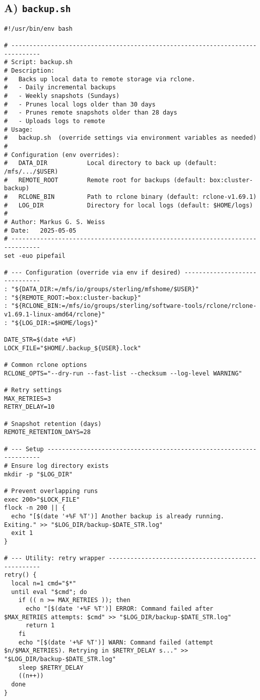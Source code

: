 \documentclass[12pt,letterpaper]{article}
\begin{document}
\subsection{A) \texttt{backup.sh}}
\begin{lstlisting}[style=custombash]
#!/usr/bin/env bash

# ------------------------------------------------------------------------------
# Script: backup.sh
# Description:
#   Backs up local data to remote storage via rclone.
#   - Daily incremental backups
#   - Weekly snapshots (Sundays)
#   - Prunes local logs older than 30 days
#   - Prunes remote snapshots older than 28 days
#   - Uploads logs to remote
# Usage:
#   backup.sh  (override settings via environment variables as needed)
#
# Configuration (env overrides):
#   DATA_DIR           Local directory to back up (default: /mfs/.../$USER)
#   REMOTE_ROOT        Remote root for backups (default: box:cluster-backup)
#   RCLONE_BIN         Path to rclone binary (default: rclone-v1.69.1)
#   LOG_DIR            Directory for local logs (default: $HOME/logs)
#
# Author: Markus G. S. Weiss
# Date:   2025-05-05
# ------------------------------------------------------------------------------
set -euo pipefail

# --- Configuration (override via env if desired) ------------------------------
: "${DATA_DIR:=/mfs/io/groups/sterling/mfshome/$USER}"
: "${REMOTE_ROOT:=box:cluster-backup}"
: "${RCLONE_BIN:=/mfs/io/groups/sterling/software-tools/rclone/rclone-v1.69.1-linux-amd64/rclone}"
: "${LOG_DIR:=$HOME/logs}"

DATE_STR=$(date +%F)
LOCK_FILE="$HOME/.backup_${USER}.lock"

# Common rclone options
RCLONE_OPTS="--dry-run --fast-list --checksum --log-level WARNING"

# Retry settings
MAX_RETRIES=3
RETRY_DELAY=10

# Snapshot retention (days)
REMOTE_RETENTION_DAYS=28

# --- Setup --------------------------------------------------------------------
# Ensure log directory exists
mkdir -p "$LOG_DIR"

# Prevent overlapping runs
exec 200>"$LOCK_FILE"
flock -n 200 || {
  echo "[$(date '+%F %T')] Another backup is already running. Exiting." >> "$LOG_DIR/backup-$DATE_STR.log"
  exit 1
}

# --- Utility: retry wrapper ---------------------------------------------------
retry() {
  local n=1 cmd="$*"
  until eval "$cmd"; do
    if (( n >= MAX_RETRIES )); then
      echo "[$(date '+%F %T')] ERROR: Command failed after $MAX_RETRIES attempts: $cmd" >> "$LOG_DIR/backup-$DATE_STR.log"
      return 1
    fi
    echo "[$(date '+%F %T')] WARN: Command failed (attempt $n/$MAX_RETRIES). Retrying in $RETRY_DELAY s..." >> "$LOG_DIR/backup-$DATE_STR.log"
    sleep $RETRY_DELAY
    ((n++))
  done
}


\end{lstlisting}
\end{document}

